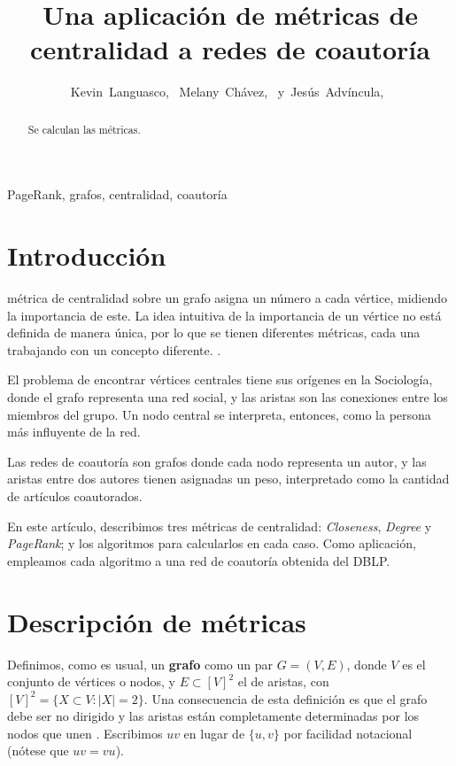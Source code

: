 \documentclass[journal]{IEEEtran}
\begin{document}
\title{Una aplicación de métricas de centralidad a redes de coautoría}
\author{Kevin~Languasco,~
        Melany~Chávez,~
        y~Jesús~Advíncula,~%
}

\maketitle
\begin{abstract}
Se calculan las métricas.
\end{abstract}
\begin{IEEEkeywords}
PageRank, grafos, centralidad, coautoría
\end{IEEEkeywords}
\IEEEpeerreviewmaketitle

\section{Introducción}
 métrica de centralidad sobre un grafo asigna un número a cada vértice, midiendo la importancia de este. La idea intuitiva de la importancia de un vértice no está definida de manera única, por lo que se tienen diferentes métricas, cada una trabajando con un concepto diferente. \cite{brandes}.

El problema de encontrar vértices centrales tiene sus orígenes en la Sociología, donde el grafo representa una red social, y las aristas son las conexiones entre los miembros del grupo. Un nodo central se interpreta, entonces, como la persona más influyente de la red.

Las redes de coautoría son grafos donde cada nodo representa un autor, y las aristas entre dos autores tienen asignadas un peso, interpretado como la cantidad de artículos coautorados.

En este artículo, describimos tres métricas de centralidad: \textit{Closeness}, \textit{Degree} y \textit{PageRank}; y los algoritmos para calcularlos en cada caso. Como aplicación, empleamos cada algoritmo a una red de coautoría obtenida del DBLP.

\section{Descripción de métricas} \label{sec:metricas}

Definimos, como es usual, un \textbf{grafo} como un par \(G = (V, E)\), donde \(V\) es el conjunto de vértices o nodos, y \(E \subset [V]^2 \) el de aristas, con \([V]^2 = \{ X \subset V : |X| = 2 \}\). Una consecuencia de esta definición es que el grafo debe ser no dirigido y las aristas están completamente determinadas por los nodos que unen \cite{diestel}. Escribimos \(uv\) en lugar de \(\{u, v\}\) por facilidad notacional (nótese que \(uv = vu\)).
\end{document}
